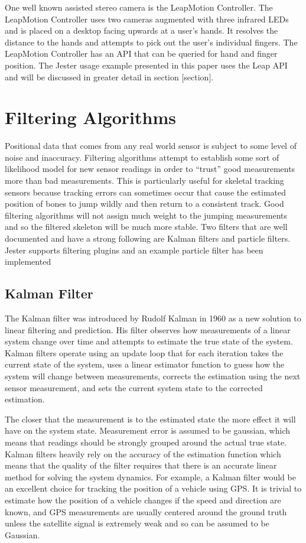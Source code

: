 One well known assisted stereo camera is the LeapMotion Controller. The LeapMotion Controller uses two cameras augmented with three infrared LEDs and is placed on a desktop facing upwards at a user’s hands. It resolves the distance to the hands and attempts to pick out the user’s individual fingers. The LeapMotion Controller has an API that can be queried for hand and finger position. The Jester usage example presented in this paper uses the Leap API and will be discussed in greater detail in section [section].

\section{Filtering Algorithms}

Positional data that comes from any real world sensor is subject to some level of noise and inaccuracy. Filtering algorithms attempt to establish some sort of likelihood model for new sensor readings in order to “trust” good measurements more than bad measurements. This is particularly useful for skeletal tracking sensors because tracking errors can sometimes occur that cause the estimated position of bones to jump wildly and then return to a consistent track. Good filtering algorithms will not assign much weight to the jumping measurements and so the filtered skeleton will be much more stable. Two filters that are well documented and have a strong following are Kalman filters and particle filters. Jester supports filtering plugins and an example particle filter has been implemented

\subsection{Kalman Filter}

The Kalman filter was introduced by Rudolf Kalman in 1960 as a new solution to linear filtering and prediction. His filter observes how measurements of a linear system change over time and attempts to estimate the true state of the system. Kalman filters operate using an update loop that for each iteration takes the current state of the system, uses a linear estimator function to guess how the system will change between measurements, corrects the estimation using the next sensor measurement, and sets the current system state to the corrected estimation. 

The closer that the measurement is to the estimated state the more effect it will have on the system state. Measurement error is assumed to be gaussian, which means that readings should be strongly grouped around the actual true state. Kalman filters heavily rely on the accuracy of the estimation function which means that the quality of the filter requires that there is an accurate linear method for solving the system dynamics. For example, a Kalman filter would be an excellent choice for tracking the position of a vehicle using GPS. It is trivial to estimate how the position of a vehicle changes if the speed and direction are known, and GPS measurements are usually centered around the ground truth unless the satellite signal is extremely weak and so can be assumed to be Gaussian. 

